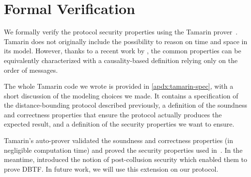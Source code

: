 \section{Formal Verification}\label{formal-verification}

We formally verify the protocol security properties using the Tamarin
prover~\cite{meier2013tamarin}. Tamarin does not originally include
the possibility to reason on time and space in its model.  However,
thanks to a recent work by \textcite{TamarinDB}, the common properties
can be equivalently characterized with a causality-based definition
relying only on the order of messages.

The whole Tamarin code we wrote is provided in \cref{apdx:tamarin-spec}, with a short discussion of the modeling choices we made. 
It contains a specification of the distance-bounding protocol described previously, a definition of the soundness and correctness properties that ensure the protocol actually produces the expected result, and a definition of the security properties we want to ensure.

Tamarin's auto-prover validated the soundness and correctness
properties (in negligible computation time) and proved the security
properties used in~\cite{TamarinDB}. In the meantime,
\textcite{TamarinDBTF} introduced the notion of post-collusion
security which enabled them to prove \ac{DBTF}. In future work, we
will use this extension on our protocol.



